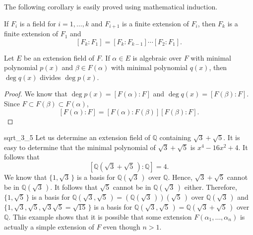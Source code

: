 \medskip
 

The following corollary is easily proved using mathematical induction. 
 

\begin{corollary}
If $F_i$ is a field for $i = 1, \dots, k$ and $F_{i+1}$ is a finite
extension of $F_i$, then $F_k$ is a finite extension of $F_1$ and 
\[ 
[F_k : F_1] = [F_k : F_{k-1} ] \cdots [F_2 : F_1 ].
\]
\end{corollary}
 
 
\begin{corollary}
Let $E$ be an extension field of $F$. If $\alpha \in E$ is algebraic over
$F$ with minimal polynomial $p(x)$ and $\beta \in F( \alpha )$ with
minimal polynomial $q(x)$, then $\deg q(x)$ divides $\deg p(x)$. 
\end{corollary}
 

\begin{proof}
We know that $\deg p(x) = [F( \alpha ) : F ]$ and $\deg q(x) = [F(
\beta ) : F ]$. Since $F \subset F( \beta ) \subset F( \alpha )$,
\[
[F( \alpha ) : F ]=
[ F( \alpha ) : F( \beta ) ] [ F( \beta ) : F ].
\]
\end{proof}
 

\begin{example}{sqrt_3_5} %
Let us determine an extension field of ${\mathbb Q}$ containing $\sqrt{3}
+ \sqrt{5}$. It is easy to determine that the minimal  polynomial of
$\sqrt{3} + \sqrt{5}$ is $x^4 - 16 x^2 + 4$. It follows that
\[
[ {\mathbb Q}( \sqrt{3} + \sqrt{5}\, ) : {\mathbb Q} ] = 4.
\]
We know that $\{ 1, \sqrt{3}\, \}$ is a basis for  ${\mathbb Q}( \sqrt{3}\,
)$ over ${\mathbb Q}$. Hence, $\sqrt{3} + \sqrt{5}$ cannot be in ${\mathbb
Q}( \sqrt{3}\, )$. It follows that $\sqrt{5}$ cannot be in ${\mathbb Q}(
\sqrt{3}\, )$ either. Therefore, $\{ 1, \sqrt{5}\, \}$ is a basis for
${\mathbb Q}( \sqrt{3}, \sqrt{5}\, ) = ( {\mathbb Q}(\sqrt{3}\, ))( \sqrt{5}\, )$
over ${\mathbb Q}( \sqrt{3}\, )$ and $\{ 1, \sqrt{3}, \sqrt{5}, \sqrt{3}
\sqrt{5} = \sqrt{15}\,  \}$ is a basis for ${\mathbb Q}( \sqrt{3},
\sqrt{5}\, ) = {\mathbb Q}( \sqrt{3} + \sqrt{5}\, )$ over ${\mathbb Q}$. 
This example shows that it is possible
that some extension $F( \alpha_1, \ldots, \alpha_n )$ is actually a
simple extension of $F$ even though $n > 1$. 
\end{example}
 

